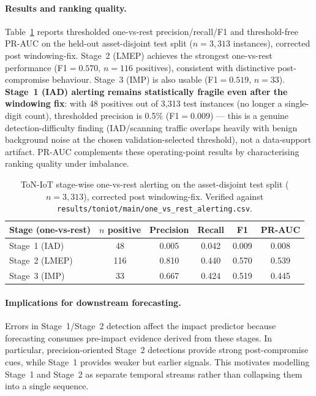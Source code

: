 \documentclass[pdflatex,sn-mathphys-num]{sn-jnl}
\theoremstyle{thmstyleone}%
\theoremstyle{thmstyletwo}%
\theoremstyle{thmstylethree}%
\begin{document}
\paragraph{Results and ranking quality.}
Table~\ref{tab:ovr_combined} reports thresholded one-vs-rest precision/recall/F1 and threshold-free PR-AUC on the held-out asset-disjoint test split ($n=3{,}313$ instances), corrected post windowing-fix. Stage~2 (LMEP) achieves the strongest one-vs-rest performance (F1$=0.570$, $n=116$ positives), consistent with distinctive post-compromise behaviour. Stage~3 (IMP) is also usable (F1$=0.519$, $n=33$). \textbf{Stage~1 (IAD) alerting remains statistically fragile even after the windowing fix}: with 48 positives out of 3,313 test instances (no longer a single-digit count), thresholded precision is 0.5\% (F1$=0.009$) --- this is a genuine detection-difficulty finding (IAD/scanning traffic overlaps heavily with benign background noise at the chosen validation-selected threshold), not a data-support artifact. PR-AUC complements these operating-point results by characterising ranking quality under imbalance.

\begin{table}[!t]
\centering
\caption{ToN-IoT stage-wise one-vs-rest alerting on the asset-disjoint test split ($n=3{,}313$), corrected post windowing-fix. Verified against \texttt{results/toniot/main/one\_vs\_rest\_alerting.csv}.}
\label{tab:ovr_combined}
\renewcommand{\arraystretch}{1.15}
\begin{tabular}{lccccc}
\toprule
\textbf{Stage (one-vs-rest)} & \textbf{$n$ positive} & \textbf{Precision} & \textbf{Recall} & \textbf{F1} & \textbf{PR-AUC} \\
\midrule
Stage~1 (IAD)  & 48  & 0.005 & 0.042 & 0.009 & 0.008 \\
Stage~2 (LMEP) & 116 & 0.810 & 0.440 & 0.570 & 0.539 \\
Stage~3 (IMP)  & 33  & 0.667 & 0.424 & 0.519 & 0.445 \\
\bottomrule
\end{tabular}
\end{table}

\paragraph{Implications for downstream forecasting.}
Errors in Stage~1/Stage~2 detection affect the impact predictor because forecasting consumes pre-impact evidence derived from these stages.
In particular, precision-oriented Stage~2 detections provide strong post-compromise cues, while Stage~1 provides weaker but earlier signals.
This motivates modelling Stage~1 and Stage~2 as separate temporal streams rather than collapsing them into a single sequence.
\end{document}
